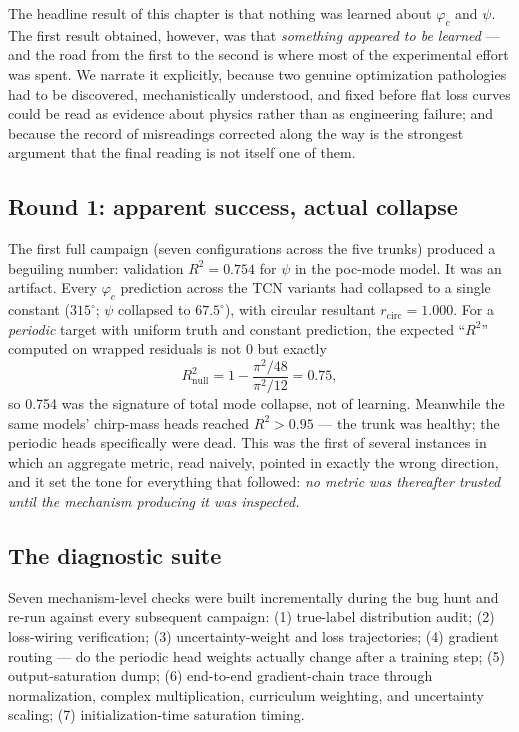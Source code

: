 The headline result of this chapter is that nothing was learned about $\varphi_c$ and $\psi$.
The first result obtained, however, was that \emph{something appeared to be learned} --- and the road from the first to the second is where most of the experimental effort was spent.
We narrate it explicitly, because two genuine optimization pathologies had to be discovered, mechanistically understood, and fixed before flat loss curves could be read as evidence about physics rather than as engineering failure; and because the record of misreadings corrected along the way is the strongest argument that the final reading is not itself one of them.

\subsection{Round 1: apparent success, actual collapse}
\label{sec:phicpsi:round1}

The first full campaign (seven configurations across the five trunks) produced a beguiling number: validation $R^2 = 0.754$ for $\psi$ in the poc-mode model.
It was an artifact.
Every $\varphi_c$ prediction across the TCN variants had collapsed to a single constant ($315^\circ$; $\psi$ collapsed to $67.5^\circ$), with circular resultant $r_{\mathrm{circ}} = 1.000$.
For a \emph{periodic} target with uniform truth and constant prediction, the expected ``$R^2$'' computed on wrapped residuals is not 0 but exactly
\begin{equation}
    R^2_{\mathrm{null}} = 1 - \frac{\pi^2/48}{\pi^2/12} = 0.75,
\end{equation}
so 0.754 was the signature of total mode collapse, not of learning.
Meanwhile the same models' chirp-mass heads reached $R^2 > 0.95$ --- the trunk was healthy; the periodic heads specifically were dead.
This was the first of several instances in which an aggregate metric, read naively, pointed in exactly the wrong direction, and it set the tone for everything that followed: \emph{no metric was thereafter trusted until the mechanism producing it was inspected.}

\subsection{The diagnostic suite}
\label{sec:phicpsi:suite}

Seven mechanism-level checks were built incrementally during the bug hunt and re-run against every subsequent campaign: (1) true-label distribution audit; (2) loss-wiring verification; (3) uncertainty-weight and loss trajectories; (4) gradient routing --- do the periodic head weights actually change after a training step; (5) output-saturation dump; (6) end-to-end gradient-chain trace through normalization, complex multiplication, curriculum weighting, and uncertainty scaling; (7) initialization-time saturation timing.

